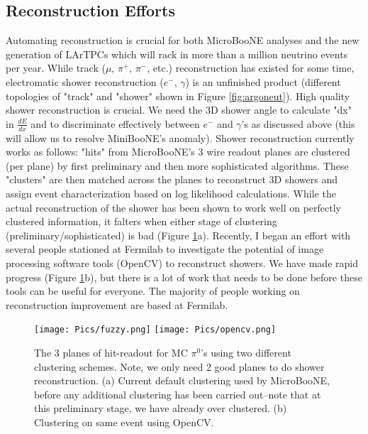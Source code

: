 \documentclass[12pt]{article}
\begin{document}
\subsection{Reconstruction Efforts}
Automating reconstruction is crucial for both MicroBooNE analyses and the new generation of LArTPCs which will rack in more than a million neutrino events per year. While track ($\mu$, $\pi^+$, $\pi^-$, etc.) reconstruction has existed for some time, electromatic shower reconstruction ($e^-$, $\gamma$) is an unfinished product (different topologies of "track" and "shower" shown in Figure \ref{fig:argoneut}). High quality shower reconstruction is crucial. We need the 3D shower angle to calculate "dx" in $\frac{dE}{dx}$ and to discriminate effectively between $e^-$ and $\gamma$'s as discussed above (this will allow us to resolve MiniBooNE's anomaly). Shower reconstruction currently works as follows: "hits" from MicroBooNE's 3 wire readout planes are clustered (per plane) by first preliminary and then more sophisticated algorithms. These "clusters" are then matched across the planes to reconstruct 3D showers and assign event characterization based on log likelihood calculations. While the actual reconstruction of the shower has been shown to work well on perfectly clustered information, it falters when either stage of clustering (preliminary/sophisticated) is bad (Figure \ref{fig:fuzzy}a). Recently, I began an effort with several people stationed at Fermilab to investigate the potential of image processing software tools (OpenCV) to reconstruct showers. We have made rapid progress (Figure \ref{fig:fuzzy}b), but there is a lot of work that needs to be done before these tools can be useful for everyone. The majority of people working on reconstruction improvement are based at Fermilab. 

\begin{figure}[h!]
\centering
\texttt{[image: Pics/fuzzy.png]}
\hspace{.5 cm}
\texttt{[image: Pics/opencv.png]}
\caption{The 3 planes of hit-readout for MC $\pi^0$'s using two different clustering schemes. Note, we only need 2 good planes to do shower reconstruction.  (a) Current default clustering used by MicroBooNE, before any additional clustering has been carried out--note that at this preliminary stage, we have already over clustered. (b) Clustering on same event using OpenCV.}
\label{fig:fuzzy}
\end{figure}
\end{document}
